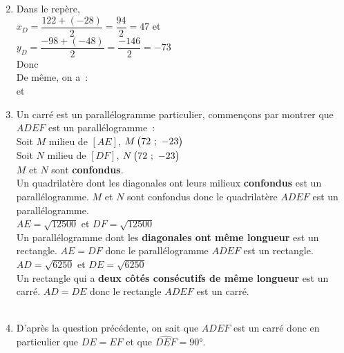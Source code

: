 \newpage

\begin{minipage}{0.45\textwidth}
\thispagestyle{vide}

\vspace*{1em}


\begin{enumerate}
	\setcounter{enumi}{1}
	\item Dans le repère,\\[1em]
			$x_D = \dfrac{122 + (-28)}{2} = \dfrac{94}{2} = 47$ et\\
			$y_D = \dfrac{-98 + (-48)}{2} = \dfrac{-146}{2} = -73$\\[1em]
			Donc \\[1em]
			De même, on a~:\\[1em]  et 
	\item Un carré est un parallélogramme particulier, commençons par montrer que $ADEF$ est un parallélogramme~:\\
			Soit $M$ milieu de $[AE]$, $M\begin{pmatrix}72~;~-23\end{pmatrix}$\\
			Soit $N$ milieu de $[DF]$, $N\begin{pmatrix}72~;~-23\end{pmatrix}$\\
			$M$ et $N$ sont \textbf{confondus}.\\
			Un quadrilatère dont les diagonales ont leurs milieux \textbf{confondus} est un parallélogramme. $M$ et $N$ sont confondus donc le quadrilatère $ADEF$ est un parallélogramme.\\[1em]
			$AE = \sqrt{12500}$ et $DF = \sqrt{12500}$\\
			Un parallélogramme dont les \textbf{diagonales ont même longueur} est un rectangle. $AE = DF$ donc le parallélogramme $ADEF$ est un rectangle.\\[1em]
			$AD = \sqrt{6250}$ et $DE = \sqrt{6250}$\\			
			Un rectangle qui a \textbf{deux côtés consécutifs de même longueur} est un carré. $AD = DE$ donc le rectangle $ADEF$ est un carré.\\
			\\
	\item D'après la question précédente, on sait que $ADEF$ est un carré donc en particulier que $DE = EF$ et que $\widehat{DEF} = 90°$.\\[1em]
\end{enumerate}

\end{minipage}

